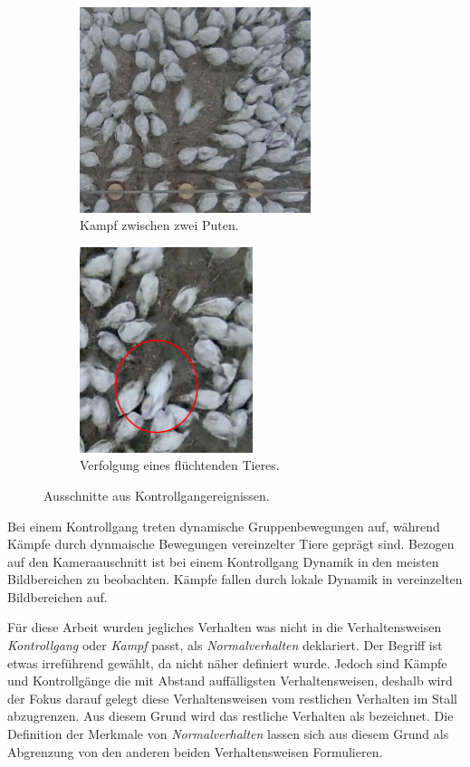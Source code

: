 \begin{figure}[htb]
     \centering
     \begin{subfigure}[b]{0.55\textwidth}
         \centering
         \includegraphics[width=\textwidth, height=6cm]{img/Verhaltensweisen/Kampf Traube.png}
         \caption{Kampf zwischen zwei Puten.}
     \end{subfigure}
     \hfill
     \begin{subfigure}[b]{0.44\textwidth}
         \centering
         \includegraphics[width=\textwidth, height=6cm]{img/Verhaltensweisen/Kampf Verfolgung.png}
         \caption{Verfolgung eines flüchtenden Tieres.}
     \end{subfigure}
     \caption[Ausschnitte aus Kampfereignissen.]{Ausschnitte aus Kontrollgangereignissen.}
     \label{fig:bspKämpf}
\end{figure}

\par

Bei einem Kontrollgang treten dynamische Gruppenbewegungen auf, während Kämpfe durch dynmaische Bewegungen vereinzelter Tiere geprägt sind. Bezogen auf den Kameraauschnitt ist bei einem Kontrollgang Dynamik in den meisten Bildbereichen zu beobachten. Kämpfe fallen durch lokale Dynamik in vereinzelten Bildbereichen auf. \par

Für diese Arbeit wurden jegliches Verhalten was nicht in die Verhaltensweisen \textit{Kontrollgang} oder \textit{Kampf} passt, als \textit{Normalverhalten} deklariert. Der Begriff ist etwas irreführend gewählt, da  nicht näher definiert wurde. Jedoch sind Kämpfe und Kontrollgänge die mit Abstand auffälligsten Verhaltensweisen, deshalb wird der Fokus darauf gelegt diese Verhaltensweisen vom restlichen Verhalten im Stall abzugrenzen. Aus diesem Grund wird das restliche Verhalten als  bezeichnet. Die Definition der Merkmale von \textit{Normalverhalten} lassen sich aus diesem Grund als Abgrenzung von den anderen beiden Verhaltensweisen Formulieren.\dubpar

